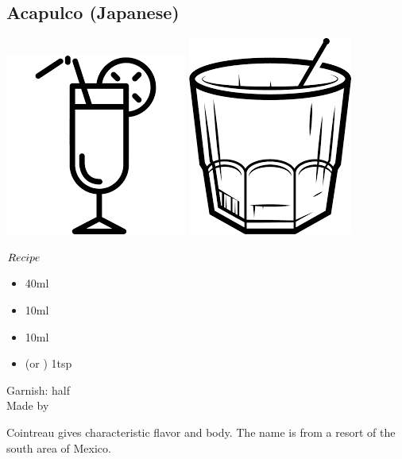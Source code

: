 \subsection{Acapulco (Japanese)}
\vspace{-7.5mm}
\hspace{54mm}
\includegraphics[scale=.07]{cocktail_glass_tall.png}
\includegraphics[scale=.06]{cocktail_glass_rock.png}
\vspace{2.5mm}
\begin{itembox}[l]{\boldmath $Recipe$}
\begin{itemize}
\setlength{\parskip}{0cm}
\setlength{\itemsep}{0cm}
\item \rum 40ml
\item \cointreau 10ml
\item \lj 10ml
\item \sugar (or \gumsyrup) 1tsp
\end{itemize}
\vspace{-4mm}
Garnish: \ew half\\
Made by \shake
\end{itembox}
Cointreau gives characteristic flavor and body.
The name is from a resort of the south area of Mexico.
